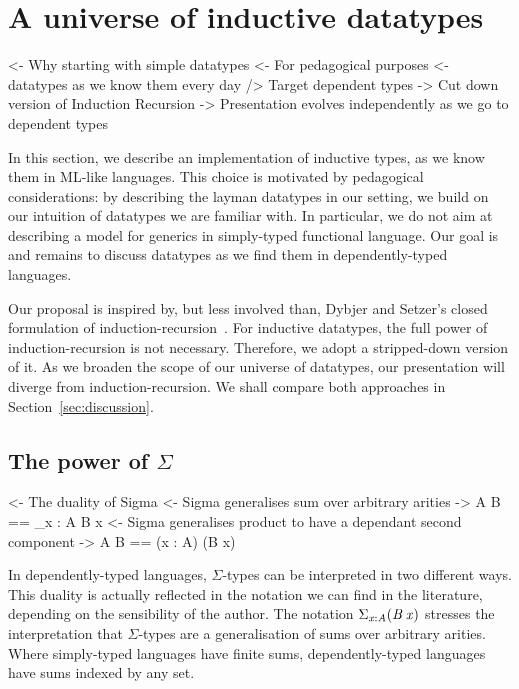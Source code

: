 \section{A universe of inductive datatypes}
\label{sec:universe-desc}

\begin{wstructure}
<- Why starting with simple datatypes
    <- For pedagogical purposes
        <- datatypes as we know them every day
        /> Target dependent types
    -> Cut down version of Induction Recursion
        -> Presentation evolves independently as we go to dependent types
\end{wstructure}

In this section, we describe an implementation of inductive types, as
we know them in ML-like languages. This choice is motivated by
pedagogical considerations: by describing the layman datatypes in our
setting, we build on our intuition of datatypes we are familiar
with. In particular, we do not aim at describing a model for generics
in simply-typed functional language. Our goal is and remains to
discuss datatypes as we find them in dependently-typed languages.

Our proposal is inspired by, but less involved than, Dybjer and
Setzer's closed formulation of
induction-recursion~\cite{dybjer:general-ir, dybjer:axiom-ir,
  dybjer:ir-initial-algebra, dybjer:iir}. For inductive datatypes, the
full power of induction-recursion is not necessary. Therefore, we
adopt a stripped-down version of it. As we broaden the scope of our
universe of datatypes, our presentation will diverge from
induction-recursion. We shall compare both approaches in
Section~\ref{sec:discussion}.

\subsection{The power of $\Sigma$}

\begin{wstructure}
<- The duality of Sigma
    <- Sigma generalises sum over arbitrary arities
        -> \Sigma A B == \Sigma_{x : A} B x
    <- Sigma generalises product to have a dependant second component
        -> \Sigma A B == (x : A) \times (B x)
\end{wstructure}

In dependently-typed languages, $\Sigma$-types can be interpreted in
two different ways. This duality is actually reflected in the notation
we can find in the literature, depending on the sensibility of the
author.  The notation $\blue{\Sigma}_{\V{x} : \V{A}} (\V{B}\: \V{x})$
stresses the interpretation that $\Sigma$-types are a generalisation
of sums over arbitrary arities.  Where simply-typed languages have
finite sums, dependently-typed languages have sums indexed by any set.


